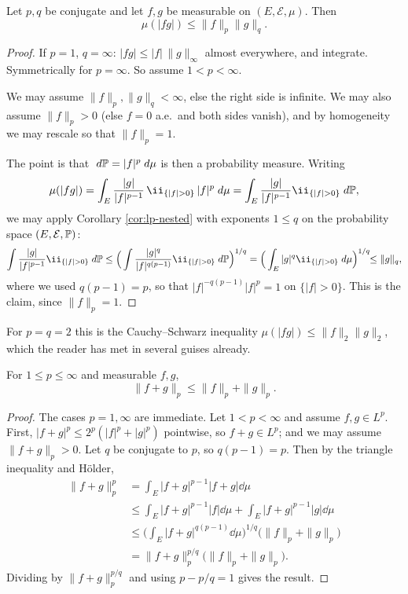\documentclass[a4paper]{scrartcl}
\newcommand{\cE}{\mathcal{E}}
\newcommand{\ind}{\ii}
\begin{document}
\begin{theorem}\label{thm:holder}
	Let $p,q$ be conjugate and let $f,g$ be measurable on $(E,\cE,\mu)$. Then
	$$
	\mu(|fg|) \leq \|f\|_p\|g\|_q.
	$$
\end{theorem}
\begin{proof}
	If $p=1$, $q=\infty$: $|fg|\leq |f|\,\|g\|_\infty$ almost everywhere, and integrate. Symmetrically for $p = \infty$. So assume $1<p<\infty$.

	We may assume $\|f\|_p, \|g\|_q < \infty$, else the right side is infinite. We may also assume $\|f\|_p > 0$ (else $f = 0$ a.e.\ and both sides vanish), and by homogeneity we may rescale so that $\|f\|_p = 1$.

	The point is that $\; d\mathbb{P} = |f|^p\; d\mu$ is then a probability measure. Writing
	$$
	\mu(|fg|) = \int_E \frac{|g|}{|f|^{p-1}}\,\ind_{\{|f|>0\}}\,|f|^p\dd\mu = \int_E \frac{|g|}{|f|^{p-1}}\ind_{\{|f|>0\}}\dd\PP,
	$$
	we may apply Corollary \ref{cor:lp-nested} with exponents $1 \leq q$ on the probability space $(E,\cE,\PP)$:
	$$
	\int \frac{|g|}{|f|^{p-1}}\ind_{\{|f|>0\}}\dd\PP \leq \Big( \int \frac{|g|^q}{|f|^{q(p-1)}}\ind_{\{|f|>0\}}\dd\PP\Big)^{1/q} = \Big( \int_E |g|^q \ind_{\{|f|>0\}}\dd\mu\Big)^{1/q}\!\! \leq \|g\|_q,
	$$
	where we used $q(p-1) = p$, so that $|f|^{-q(p-1)}|f|^p = 1$ on $\{|f|>0\}$. This is the claim, since $\|f\|_p=1$.
\end{proof}

\begin{remark}
	For $p = q = 2$ this is the Cauchy--Schwarz inequality $\mu(|fg|) \leq \|f\|_2\|g\|_2$, which the reader has met in several guises already.
\end{remark}

\begin{theorem}\label{thm:minkowski}
	For $1\leq p\leq\infty$ and measurable $f,g$,
	$$
	\|f+g\|_p \leq \|f\|_p+\|g\|_p.
	$$
\end{theorem}
\begin{proof}
	The cases $p=1,\infty$ are immediate. Let $1<p<\infty$ and assume $f,g \in L^p$. First, $|f+g|^p \leq 2^p(|f|^p+|g|^p)$ pointwise, so $f + g \in L^p$; and we may assume $\|f+g\|_p>0$. Let $q$ be conjugate to $p$, so $q(p-1)=p$. Then by the triangle inequality and H\"older,
	\begin{align*}
		\|f+g\|_p^p &= \int_E |f+g|^{p-1}|f+g|\dd\mu \\
		&\leq \int_E |f+g|^{p-1}|f|\dd\mu + \int_E |f+g|^{p-1}|g|\dd\mu\\
		&\leq \Big(\int_E |f+g|^{q(p-1)}\dd\mu\Big)^{1/q}\big(\|f\|_p+\|g\|_p\big)\\
		&= \|f+g\|_p^{p/q}\big(\|f\|_p+\|g\|_p\big).
	\end{align*}
	Dividing by $\|f+g\|_p^{p/q}$ and using $p - p/q = 1$ gives the result.
\end{proof}
\end{document}
